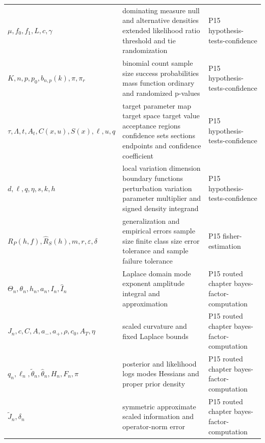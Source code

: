 \begin{longtable}{@{}p{}p{}p{}@{}}
\(\mu,\allowbreak f_0,\allowbreak f_1,\allowbreak L,\allowbreak c,\allowbreak \gamma\) & dominating measure null and alternative densities extended likelihood ratio threshold and tie randomization & P15 hypothesis-\allowbreak{}tests-\allowbreak{}confidence \\
\(K,\allowbreak n,\allowbreak p,\allowbreak p_0,\allowbreak b_{n,p}(k),\allowbreak \pi,\allowbreak \pi_r\) & binomial count sample size success probabilities mass function ordinary and randomized p-values & P15 hypothesis-\allowbreak{}tests-\allowbreak{}confidence \\
\(\tau,\allowbreak \Lambda,\allowbreak t,\allowbreak A_t,\allowbreak C(x,\allowbreak u),\allowbreak S(x),\allowbreak \ell,\allowbreak u,\allowbreak q\) & target parameter map target space target value acceptance regions confidence sets sections endpoints and confidence coefficient & P15 hypothesis-\allowbreak{}tests-\allowbreak{}confidence \\
\(d,\allowbreak \ell,\allowbreak q,\allowbreak \eta,\allowbreak s,\allowbreak k,\allowbreak h\) & local variation dimension boundary functions perturbation variation parameter multiplier and signed density integrand & P15 hypothesis-\allowbreak{}tests-\allowbreak{}confidence \\
\(R_P(h,\allowbreak f),\allowbreak \widehat R_S(h),\allowbreak m,\allowbreak r,\allowbreak \varepsilon,\allowbreak \delta\) & generalization and empirical errors sample size finite class size error tolerance and sample failure tolerance & P15 fisher-\allowbreak{}estimation \\
\(\Theta_n,\allowbreak \theta_n,\allowbreak h_n,\allowbreak a_n,\allowbreak I_n,\allowbreak \widehat I_n\) & Laplace domain mode exponent amplitude integral and approximation & P15 routed chapter bayes-\allowbreak{}factor-\allowbreak{}computation \\
\(J_n,\allowbreak c,\allowbreak C,\allowbreak A,\allowbreak a_-,\allowbreak a_+,\allowbreak \rho,\allowbreak c_0,\allowbreak A_T,\allowbreak \eta\) & scaled curvature and fixed Laplace bounds & P15 routed chapter bayes-\allowbreak{}factor-\allowbreak{}computation \\
\(q_n,\allowbreak \ell_n,\allowbreak \widetilde\theta_n,\allowbreak \widehat\theta_n,\allowbreak H_n,\allowbreak F_n,\allowbreak \pi\) & posterior and likelihood logs modes Hessians and proper prior density & P15 routed chapter bayes-\allowbreak{}factor-\allowbreak{}computation \\
\(\widetilde J_n,\allowbreak \delta_n\) & symmetric approximate scaled information and operator-norm error & P15 routed chapter bayes-\allowbreak{}factor-\allowbreak{}computation \\

\end{longtable}
